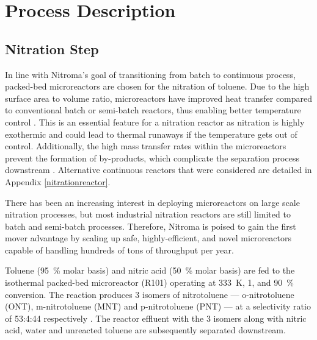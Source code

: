 \section{Process Description}
\label{sec:process}
\subsection{Nitration Step}
In line with Nitroma's goal of transitioning from batch to continuous process, packed-bed microreactors are chosen for the nitration of toluene. Due to the high surface area to volume ratio, microreactors have improved heat transfer compared to conventional batch or semi-batch reactors, thus enabling better temperature control \cite{halder_nitration_2007}. This is an essential feature for a nitration reactor as nitration is highly exothermic and could lead to thermal runaways if the temperature gets out of control. Additionally, the high mass transfer rates within the microreactors prevent the formation of by-products, which complicate the separation process downstream \cite{halder_nitration_2007}.
Alternative continuous reactors that were considered are detailed in Appendix \ref{nitrationreactor}. 

There has been an increasing interest in deploying microreactors on large scale nitration processes, but most industrial nitration reactors are still limited to batch and semi-batch processes. Therefore, Nitroma is poised to gain the first mover advantage by scaling up safe, highly-efficient, and novel microreactors capable of handling hundreds of tons of throughput per year.

Toluene (\SI{95}{\percent} molar basis) and nitric acid (\SI{50}{\percent} molar basis) are fed to the isothermal packed-bed microreactor (R101) operating at \SI{333}{\K}, \SI{1}{\atm}, and \SI{90}{\percent} conversion. The reaction produces 3 isomers of nitrotoluene --- o-nitrotoluene (ONT), m-nitrotoluene (MNT) and p-nitrotoluene (PNT) --- at a selectivity ratio of 53:4:44 respectively \cite{smith_novel_1998}. The reactor effluent with the 3 isomers along with nitric acid, water and unreacted toluene are subsequently separated downstream.


